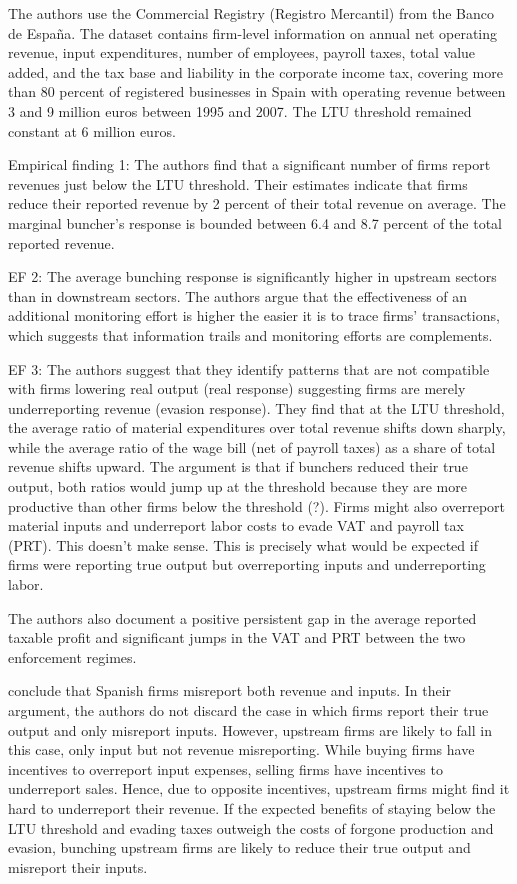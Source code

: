 \documentclass[
  12pt]{article}
\theoremstyle{definition}
\theoremstyle{remark}
\begin{document}
The authors use the Commercial Registry (Registro Mercantil) from the
Banco de España. The dataset contains firm-level information on annual
net operating revenue, input expenditures, number of employees, payroll
taxes, total value added, and the tax base and liability in the
corporate income tax, covering more than 80 percent of registered
businesses in Spain with operating revenue between 3 and 9 million euros
between 1995 and 2007. The LTU threshold remained constant at 6 million
euros.

Empirical finding 1: The authors find that a significant number of firms
report revenues just below the LTU threshold. Their estimates indicate
that firms reduce their reported revenue by 2 percent of their total
revenue on average. The marginal buncher's response is bounded between
6.4 and 8.7 percent of the total reported revenue.

EF 2: The average bunching response is significantly higher in upstream
sectors than in downstream sectors. The authors argue that the
effectiveness of an additional monitoring effort is higher the easier it
is to trace firms' transactions, which suggests that information trails
and monitoring efforts are complements.

EF 3: The authors suggest that they identify patterns that are not
compatible with firms lowering real output (real response) suggesting
firms are merely underreporting revenue (evasion response). They find
that at the LTU threshold, the average ratio of material expenditures
over total revenue shifts down sharply, while the average ratio of the
wage bill (net of payroll taxes) as a share of total revenue shifts
upward. The argument is that if bunchers reduced their true output, both
ratios would jump up at the threshold because they are more productive
than other firms below the threshold (?). Firms might also overreport
material inputs and underreport labor costs to evade VAT and payroll tax
(PRT). This doesn't make sense. This is precisely what would be expected
if firms were reporting true output but overreporting inputs and
underreporting labor.

The authors also document a positive persistent gap in the average
reported taxable profit and significant jumps in the VAT and PRT between
the two enforcement regimes.

\citet{Almunia2018} conclude that Spanish firms misreport both revenue
and inputs. In their argument, the authors do not discard the case in
which firms report their true output and only misreport inputs. However,
upstream firms are likely to fall in this case, only input but not
revenue misreporting. While buying firms have incentives to overreport
input expenses, selling firms have incentives to underreport sales.
Hence, due to opposite incentives, upstream firms might find it hard to
underreport their revenue. If the expected benefits of staying below the
LTU threshold and evading taxes outweigh the costs of forgone production
and evasion, bunching upstream firms are likely to reduce their true
output and misreport their inputs.
\end{document}
